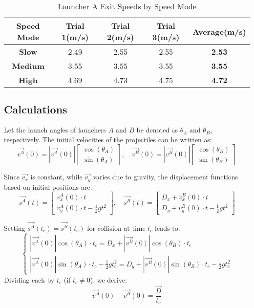 \documentclass[12pt]{article}
\begin{document}
\begin{table}[H]
    \centering
    \begin{tabular}{|c|c|c|c|c|}
        \hline
        \textbf{Speed Mode} & \textbf{Trial 1}(m/s) & \textbf{Trial 2}(m/s) & \textbf{Trial 3}(m/s) & \textbf{Average}(m/s) \\ 
        \hline
        \textbf{Slow} & 2.49 & 2.55 & 2.55 & \textbf{2.53} \\ 
        \hline
        \textbf{Medium} & 3.55 & 3.55 & 3.55 & \textbf{3.55} \\ 
        \hline
        \textbf{High} & 4.69 & 4.73 & 4.75 & \textbf{4.72} \\ 
        \hline
    \end{tabular}
    \caption{Launcher A Exit Speeds by Speed Mode}
    \label{table:ISB}
\end{table}

\subsection{Calculations}
Let the launch angles of launchers \( A \) and \( B \) be denoted as \( \theta_A \) and \( \theta_B \), respectively. The initial velocities of the projectiles can be written as:
\[
\vec{v^A}(0) = |\vec{v^A}(0)|\begin{bmatrix} \cos(\theta_A) \\ \sin(\theta_A) \end{bmatrix}, \quad \vec{v^B}(0) = |\vec{v^B}(0)|\begin{bmatrix} \cos(\theta_B) \\ \sin(\theta_B) \end{bmatrix}
\]

Since \(\vec{v_x}\) is constant, while \(\vec{v_y}\) varies due to gravity, the displacement functions based on initial positions are:
\[
\vec{s^A}(t) = \begin{bmatrix} v_x^A(0) \cdot t \\ v_y^A(0) \cdot t - \frac{1}{2} g t^2 \end{bmatrix}, \quad \vec{s^B}(t) = \begin{bmatrix} D_x + v_x^B(0) \cdot t \\ D_y + v_y^B(0) \cdot t - \frac{1}{2} g t^2 \end{bmatrix}
\]

Setting \(\vec{s^A}(t_c) = \vec{s^B}(t_c)\) for collision at time \(t_c\) leads to:
\[
\begin{cases}
    |\vec{v^A}(0)| \cos(\theta_A) \cdot t_c = D_x + |\vec{v^B}(0)| \cos(\theta_B) \cdot t_c \\
    |\vec{v^A}(0)| \sin(\theta_A) \cdot t_c - \frac{1}{2} g t_c^2 = D_y + |\vec{v^B}(0)| \sin(\theta_B) \cdot t_c - \frac{1}{2} g t_c^2
\end{cases}
\]
Dividing each by \( t_c \) (if \( t_c \neq 0 \)), we derive:
\[
\vec{v^A}(0) - \vec{v^B}(0) = \frac{\vec{D}}{t_c}
\]
\end{document}
